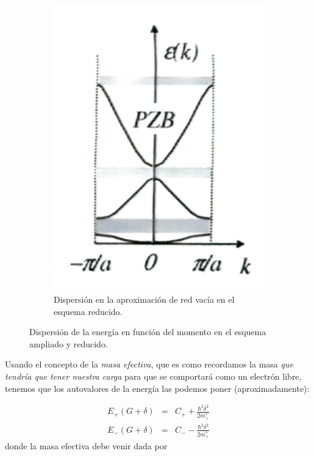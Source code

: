 \begin{figure}[h!]
\begin{subfigure}{0.45\linewidth}
\includegraphics[scale=0.4]{Cuerpo/Ch_07/04.png}
\caption{Dispersión en la aproximación de red vacía en el esquema reducido.}
\label{Fig:07-03b}
\end{subfigure} 
\caption{Dispersión de la energía en función del momento en el esquema ampliado y reducido.}
\end{figure}   

Usando el concepto de la \textit{masa efectiva}, que es como recordamos la masa \textit{que tendría que tener nuestra carga} para que se comportará como un electrón libre, tenemos que los autovalores de la energía las podemos poner (aproximadamente):

\begin{eqnarray}
	E_+ (G+\delta) & = & C_+ + \frac{\hbar^2 \delta^2}{2m_+^*} \\
	E_- (G+\delta) & = & C_- - \frac{\hbar^2 \delta^2}{2m_+^*} 
\end{eqnarray}
donde la masa efectiva debe venir dada por

